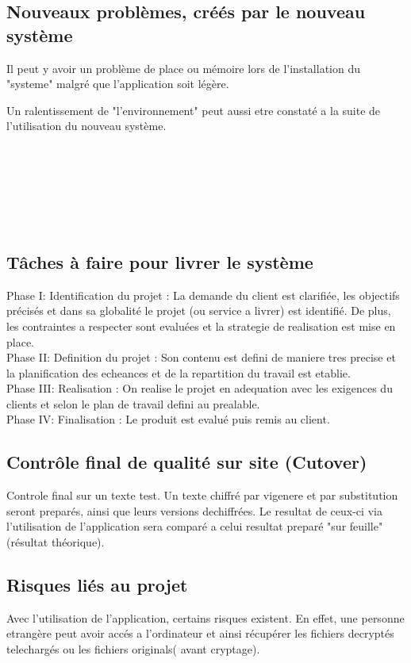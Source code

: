 \documentclass[a4]{article}
\begin{document}
		\subsection{Nouveaux problèmes, créés par le nouveau système}
		Il peut y avoir un problème de place ou mémoire lors de l'installation du "systeme" malgré que l'application 			soit légère.
		
		Un ralentissement de "l'environnement" peut aussi etre constaté a la suite de l'utilisation du nouveau 			système.
		\\ \\ \\ \\ \\ \\ \\
		\subsection{Tâches à faire pour livrer le système}
		Phase I: Identification du projet : La demande du client est clarifiée, les objectifs précisés et dans sa 			globalité le projet (ou service a livrer) est identifié. De plus, les contraintes a respecter sont 				evaluées et la strategie de realisation est mise en place.\\
		Phase II: Definition du projet : Son contenu est defini de maniere tres precise et la planification des 			echeances et de la repartition du travail est etablie.\\
		Phase III: Realisation : On realise le projet en adequation avec les exigences du clients et selon le plan de 			travail defini au prealable.\\
		Phase IV: Finalisation : Le produit est evalué puis remis au client.
		
		
		
		\subsection{Contrôle final de qualité sur site (Cutover)}
		Controle final sur un texte test. Un texte chiffré par vigenere et par substitution seront preparés, ainsi que 			leurs versions dechiffrées. Le resultat de ceux-ci via l'utilisation de l'application sera comparé a celui resultat 				preparé "sur feuille"(résultat théorique). 
		\subsection{Risques liés au projet}
		Avec l'utilisation de l'application, certains risques existent. En effet, une personne etrangère peut avoir 			accés a l'ordinateur et ainsi récupérer les fichiers decryptés telechargés ou les fichiers originals( avant cryptage).
\end{document}
